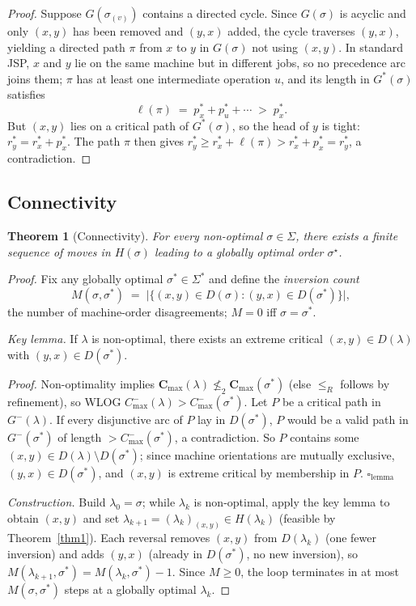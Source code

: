 \documentclass[preprint,12pt]{elsarticle}
\newtheorem{theorem}{Theorem}
\begin{document}
\begin{proof}
Suppose $G(\sigma_{(v)})$ contains a directed cycle. Since $G(\sigma)$ is acyclic and only $(x,y)$ has been removed and $(y,x)$ added, the cycle traverses $(y,x)$, yielding a directed path $\pi$ from $x$ to $y$ in $G(\sigma)$ not using $(x,y)$. In standard JSP, $x$ and $y$ lie on the same machine but in different jobs, so no precedence arc joins them; $\pi$ has at least one intermediate operation $u$, and its length in $G^*(\sigma)$ satisfies
\[
  \ell(\pi) \;=\; p_x^* + p_u^* + \cdots \;>\; p_x^*.
\]
But $(x,y)$ lies on a critical path of $G^*(\sigma)$, so the head of $y$ is tight: $r_y^*=r_x^*+p_x^*$. The path $\pi$ then gives $r_y^*\ge r_x^*+\ell(\pi)>r_x^*+p_x^*=r_y^*$, a contradiction.
\end{proof}

\subsection{Connectivity}
\label{sec:H-connectivity}

\begin{theorem}[Connectivity]
\label{thm2}
For every non-optimal $\sigma \in \Sigma$, there exists a finite sequence of moves in $H(\sigma)$ leading to a globally optimal order $\sigma^{\star}$.
\end{theorem}

\begin{proof}
Fix any globally optimal $\sigma^*\in\Sigma^*$ and define the \emph{inversion count}
\[
  M(\sigma,\sigma^*) \;=\; \bigl|\{(x,y)\in D(\sigma) : (y,x)\in D(\sigma^*)\}\bigr|,
\]
the number of machine-order disagreements; $M=0$ iff $\sigma=\sigma^*$.

\medskip
\noindent\textit{Key lemma.} If $\lambda$ is non-optimal, there exists an extreme critical $(x,y)\in D(\lambda)$ with $(y,x)\in D(\sigma^*)$.

\noindent\textit{Proof.} Non-optimality implies $\mathbf{C}_{\max}(\lambda)\not\le_2 \mathbf{C}_{\max}(\sigma^*)$ (else $\le_R$ follows by refinement), so WLOG $C^-_{\max}(\lambda)>C^-_{\max}(\sigma^*)$. Let $P$ be a critical path in $G^-(\lambda)$. If every disjunctive arc of $P$ lay in $D(\sigma^*)$, $P$ would be a valid path in $G^-(\sigma^*)$ of length $>C^-_{\max}(\sigma^*)$, a contradiction. So $P$ contains some $(x,y)\in D(\lambda)\setminus D(\sigma^*)$; since machine orientations are mutually exclusive, $(y,x)\in D(\sigma^*)$, and $(x,y)$ is extreme critical by membership in $P$. \hfill$\square_{\text{lemma}}$

\medskip
\noindent\textit{Construction.} Build $\lambda_0=\sigma$; while $\lambda_k$ is non-optimal, apply the key lemma to obtain $(x,y)$ and set $\lambda_{k+1}=(\lambda_k)_{(x,y)}\in H(\lambda_k)$ (feasible by Theorem~\ref{thm1}). Each reversal removes $(x,y)$ from $D(\lambda_k)$ (one fewer inversion) and adds $(y,x)$ (already in $D(\sigma^*)$, no new inversion), so $M(\lambda_{k+1},\sigma^*)=M(\lambda_k,\sigma^*)-1$. Since $M\ge 0$, the loop terminates in at most $M(\sigma,\sigma^*)$ steps at a globally optimal $\lambda_k$.
\end{proof}
\end{document}
